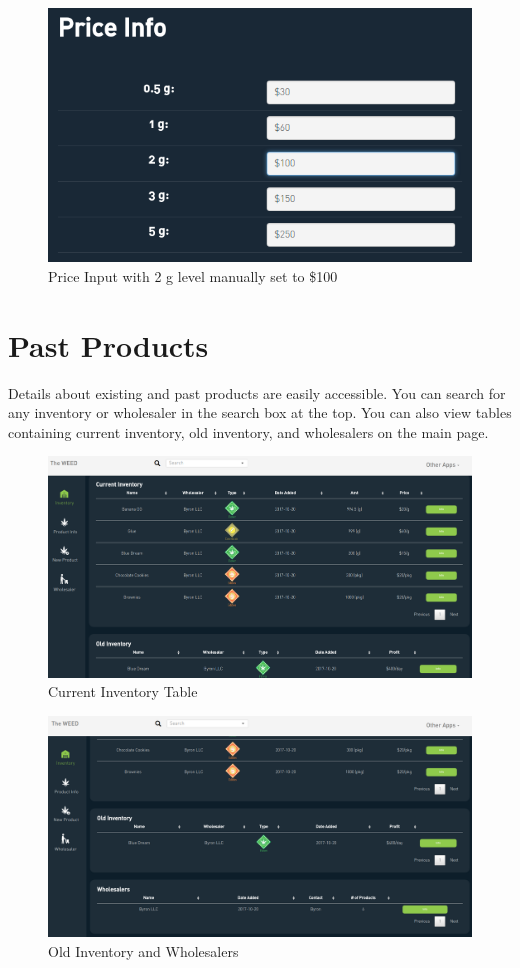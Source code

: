 \documentclass[]{book}
\theoremstyle{definition}
\theoremstyle{definition}
\theoremstyle{definition}
\theoremstyle{remark}
\begin{document}
\begin{figure}
\centering
\includegraphics{images/I3.png}
\caption{Price Input with 2 g level manually set to \$100}
\end{figure}

\section{Past Products}\label{past-products}

Details about existing and past products are easily accessible. You can
search for any inventory or wholesaler in the search box at the top. You
can also view tables containing current inventory, old inventory, and
wholesalers on the main page.

\begin{figure}
\centering
\includegraphics{images/inventory.png}
\caption{Current Inventory Table}
\end{figure}

\begin{figure}
\centering
\includegraphics{images/inventory2.png}
\caption{Old Inventory and Wholesalers}
\end{figure}
\end{document}
